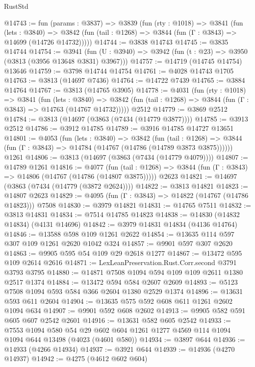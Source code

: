 \begin{lexlean}{RustStd}
\begin{coremodule}
@14743 := fun (params : @3837) =>
  @3839
    (fun (rty : @1018) =>
    @3841
      (fun (lets : @3840) =>
      @3842 (fun (tail : @1268) => @3844 (fun (Γ : @3843) => @14699 (@14726 @14732)))))
@14744 := @3838 @14743
@14745 := @3835 @14744
@14754 := @3941
    (fun (U : @3940) => @3942 (fun (t : @23) => @3950 (@3813 (@3956 @13648 @3831) @3967)))
@14757 := @14719 (@14745 @14754) @13646
@14759 := @3798 @14744 @14754
@14761 := @4028 @14743 @1705
@14763 := @3813 (@14697 @7436)
@14764 := @14722 @7439
@14765 := @3884 @14764
@14767 := @3813 (@14765 @3905)
@14778 := @4031
    (fun (rty : @1018) =>
    @3841
      (fun (lets : @3840) =>
      @3842 (fun (tail : @1268) => @3844 (fun (Γ : @3843) => @14763 (@14767 @14732)))))
    @2512
@14779 := @3869 @2512
@14784 := @3813 (@14697 (@3863 (@7434 (@14779 @3877))))
@14785 := @3913 @2512
@14786 := @3912 @14785
@14789 := @3916 @14785 @14727 @13651
@14801 := @4053
    (fun (lets : @3840) =>
    @3842
      (fun (tail : @1268) =>
      @3844 (fun (Γ : @3843) => @14784 (@14767 (@14786 (@14789 @3873 @3875))))))
    @1261
@14806 := @3813 (@14697 (@3863 (@7434 (@14779 @4079))))
@14807 := @14789 @1261
@14816 := @4077
    (fun (tail : @1268) => @3844 (fun (Γ : @3843) => @14806 (@14767 (@14786 (@14807 @3875)))))
    @2623
@14821 := @14697 (@3863 (@7434 (@14779 (@3872 @2624))))
@14822 := @3813 @14821
@14823 := @14807 @2623
@14829 := @4095 (fun (Γ : @3843) => @14822 (@14767 (@14786 @14823))) @7508
@14830 := @3979 @14821
@14831 := @14765 @7511
@14832 := @3813 @14831
@14834 := @7514 @14785 @14823
@14838 := @14830 (@14832 @14834) (@4131 @14696)
@14842 := @3979 @14831 @14834 (@4136 @14764)
@14846 := @13588 @598 @109 @1261 @2622
@14854 := @13635 @114 @597 @307 @109 @1261 @2620 @1042 @324
@14857 := @9901 @597 @307 @2620
@14863 := @9905 @595 @54 @109 @29 @2618 @1277
@14867 := @13472 @595 @109 @2614 @2616
@14871 := LexLeanPreservation.Rust.Corr.second @3791 @3793 @3795
@14880 := @14871 @7508 @1094 @594 @109 @109 @2611 @1380 @2517 @1374
@14884 := @13472 @594 @584 @2607 @2609
@14893 := @5123 @7508 @1094 @593 @584 @366 @2604 @1380 @2529 @1374
@14896 := @13631 @593 @611 @2604
@14904 := @13635 @575 @592 @608 @611 @1261 @2602 @1094 @634
@14907 := @9901 @592 @608 @2602
@14913 := @9905 @582 @591 @605 @607 @2542 @2601
@14916 := @13631 @582 @605 @2542
@14933 := @7553
    @1094
    @580
    @54
    @29
    @602
    @604
    @1261
    @1277
    @4569
    @114
    @1094
    @1094
    @644
    @13498
    (@4023 (@4601 @580))
@14934 := @3897 @644
@14936 := @14933 (@4266 @14934)
@14937 := @3921 @644
@14939 := @14936 (@4270 @14937)
@14942 := @4275 (@4612 @602 @604)

\end{coremodule}
\end{lexlean}
